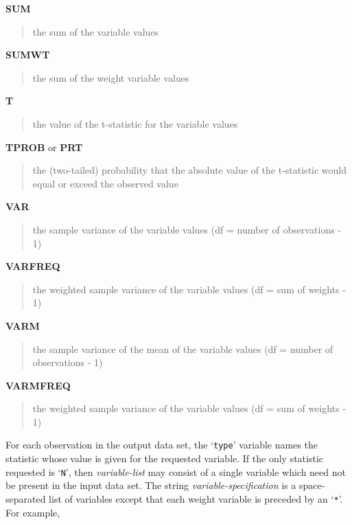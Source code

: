 \documentclass{book}
\newcommand\Texinfocommandstyletextvar[1]{{\normalfont{}\textsl{#1}}}%
\renewcommand{\_}{\Texinfounderscore\discretionary{}{}{}}
\begin{document}
\textbf{SUM}
\begin{quote}
the sum of the variable values
\end{quote}
%

\textbf{SUMWT}
\begin{quote}
the sum of the weight variable values
\end{quote}
%

\textbf{T}
\begin{quote}
the value of the t-statistic for the variable values
\end{quote}
%
%

\textbf{TPROB} or \textbf{PRT}
\begin{quote}
the (two-tailed) probability that the absolute value of the t-statistic would equal or exceed the observed value
\end{quote}
%

\textbf{VAR}
\begin{quote}
the sample variance of the variable values (df = number of observations - 1)
\end{quote}
%

\textbf{VARFREQ}
\begin{quote}
the weighted sample variance of the variable values (df = sum of weights - 1)
\end{quote}
%

\textbf{VARM}
\begin{quote}
the sample variance of the mean of the variable values (df = number of observations - 1)
\end{quote}
%

\textbf{VARMFREQ}
\begin{quote}
the weighted sample variance of the variable values (df = sum of weights - 1)
\end{quote}
%

For each observation in the output data set, the `\texttt{\_type\_}'
variable names the statistic whose
value is given for the requested variable.
If the only statistic requested is `\texttt{N}',
%
then \Texinfocommandstyletextvar{variable-list}
may consist of a single variable
which need not be present in the input data set.
The string \Texinfocommandstyletextvar{variable-specification}
is a space-separated list of variables except that each weight
%
variable is preceded by an `\texttt{*}'.
For example,
\end{document}
